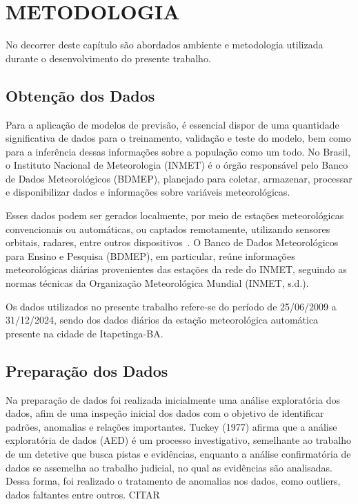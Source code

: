 \chapter{METODOLOGIA}

No decorrer deste capítulo são abordados ambiente e metodologia utilizada durante o
desenvolvimento do presente trabalho.

\section{Obtenção dos Dados}

    Para a aplicação de modelos de previsão, é essencial dispor de uma quantidade significativa de dados para o 
    treinamento, validação e teste do modelo, bem como para a inferência dessas informações sobre a população como um 
    todo. No Brasil, o Instituto Nacional de Meteorologia (INMET) é o órgão responsável pelo Banco de Dados 
    Meteorológicos (BDMEP), planejado para coletar, armazenar, processar e disponibilizar dados e informações sobre 
    variáveis meteorológicas. 

    Esses dados podem ser gerados localmente, por meio de estações meteorológicas convencionais ou automáticas, 
    ou captados remotamente, utilizando sensores orbitais, radares, entre outros dispositivos~\cite{vianna2017}. 
    O Banco de Dados Meteorológicos para Ensino e Pesquisa (BDMEP), em particular, reúne informações meteorológicas 
    diárias provenientes das estações da rede do INMET, seguindo as normas técnicas da Organização Meteorológica 
    Mundial (INMET, s.d.).

    Os dados utilizados no presente trabalho refere-se do período de 25/06/2009 a 31/12/2024, sendo dos dados 
    diários da estação meteorológica automática presente na cidade de Itapetinga-BA.
\section{Preparação dos Dados}
    Na preparação de dados foi realizada inicialmente uma análise exploratória dos dados, afim de uma inspeção
    inicial dos dados com o objetivo de identificar padrões, anomalias e relações importantes. 
    Tuckey (1977) afirma que a análise exploratória de dados (AED) é um processo investigativo, semelhante ao 
    trabalho de um detetive que busca pistas e evidências, enquanto a análise confirmatória de dados se 
    assemelha ao trabalho judicial, no qual as evidências são analisadas. Dessa forma, foi realizado o tratamento
    de anomalias nos dados, como outliers, dados faltantes entre outros. CITAR


